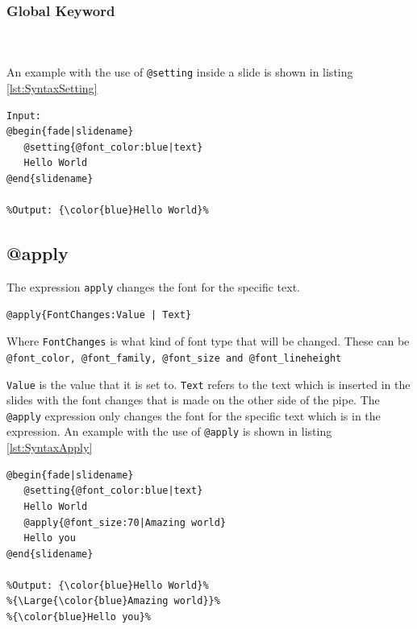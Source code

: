 {{\subsubsection*{Global Keyword}
\\ \\
An example with the use of \lstinline!@setting! inside a slide is shown in listing \ref{lst:SyntaxSetting}

\begin{lstlisting}[frame=single, caption=Hello World with setting, label=lst:SyntaxSetting]
Input:
@begin{fade|slidename}
   @setting{@font_color:blue|text}
   Hello World
@end{slidename}

%Output: {\color{blue}Hello World}%
\end{lstlisting}

\subsection{@apply}
The expression \texttt{apply} changes the font for the specific text.
\begin{lstlisting}[frame=single, caption=Generic \texttt{apply} expression example]
@apply{FontChanges:Value | Text}
\end{lstlisting}
Where \texttt{FontChanges} is what kind of font type that will be changed. These can be \lstinline!@font_color, @font_family, @font_size and @font_lineheight!

\texttt{Value} is the value that it is set to.
\texttt{Text} refers to the text which is inserted in the slides with the font changes that is made on the other side of the pipe.
The \lstinline!@apply! expression only changes the font for the specific text which is in the expression.
An example with the use of \lstinline!@apply! is shown in listing \ref{lst:SyntaxApply}

\begin{lstlisting}[frame=single, caption=Hello World with apply, label=lst:SyntaxApply]
@begin{fade|slidename}
   @setting{@font_color:blue|text}
   Hello World
   @apply{@font_size:70|Amazing world}
   Hello you
@end{slidename}

%Output: {\color{blue}Hello World}%
%{\Large{\color{blue}Amazing world}}%
%{\color{blue}Hello you}%
\end{lstlisting}

}}
